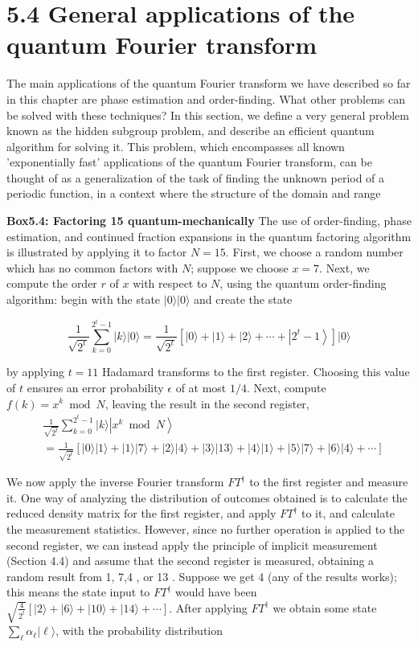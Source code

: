 
\section*{5.4 General applications of the quantum Fourier transform}
The main applications of the quantum Fourier transform we have described so far in this chapter are phase estimation and order-finding. What other problems can be solved with these techniques? In this section, we define a very general problem known as the hidden subgroup problem, and describe an efficient quantum algorithm for solving it. This problem, which encompasses all known 'exponentially fast' applications of the quantum Fourier transform, can be thought of as a generalization of the task of finding the unknown period of a periodic function, in a context where the structure of the domain and range

\textbf{Box5.4: Factoring 15 quantum-mechanically}
The use of order-finding, phase estimation, and continued fraction expansions in the quantum factoring algorithm is illustrated by applying it to factor $N=15$. First, we choose a random number which has no common factors with $N$; suppose we choose $x=7$. Next, we compute the order $r$ of $x$ with respect to $N$, using the quantum order-finding algorithm: begin with the state $|0\rangle|0\rangle$ and create the state

\begin{equation*}
\frac{1}{\sqrt{2^{t}}} \sum_{k=0}^{2^{t}-1}|k\rangle|0\rangle=\frac{1}{\sqrt{2^{t}}}\left[|0\rangle+|1\rangle+|2\rangle+\cdots+\left|2^{t}-1\right\rangle\right]|0\rangle \tag{5.61}
\end{equation*}

by applying $t=11$ Hadamard transforms to the first register. Choosing this value of $t$ ensures an error probability $\epsilon$ of at most $1 / 4$. Next, compute $f(k)=x^{k} \bmod N$, leaving the result in the second register,
\begin{align*}
& \frac{1}{\sqrt{2^{t}}} \sum_{k=0}^{2^{t}-1}|k\rangle\left|x^{k} \bmod N\right\rangle  \tag{5.62}\\
& =\frac{1}{\sqrt{2^{t}}}[|0\rangle|1\rangle+|1\rangle|7\rangle+|2\rangle|4\rangle+|3\rangle|13\rangle+|4\rangle|1\rangle+|5\rangle|7\rangle+|6\rangle|4\rangle+\cdots]
\end{align*}

We now apply the inverse Fourier transform $F T^{\dagger}$ to the first register and measure it. One way of analyzing the distribution of outcomes obtained is to calculate the reduced density matrix for the first register, and apply $F T^{\dagger}$ to it, and calculate the measurement statistics. However, since no further operation is applied to the second register, we can instead apply the principle of implicit measurement (Section 4.4) and assume that the second register is measured, obtaining a random result from 1, 7,4 , or 13 . Suppose we get 4 (any of the results works); this means the state input to $F T^{\dagger}$ would have been $\sqrt{\frac{4}{2^{t}}}[|2\rangle+|6\rangle+|10\rangle+|14\rangle+\cdots]$. After applying $F T^{\dagger}$ we obtain some state $\sum_{\ell} \alpha_{\ell}|\ell\rangle$, with the probability distribution

